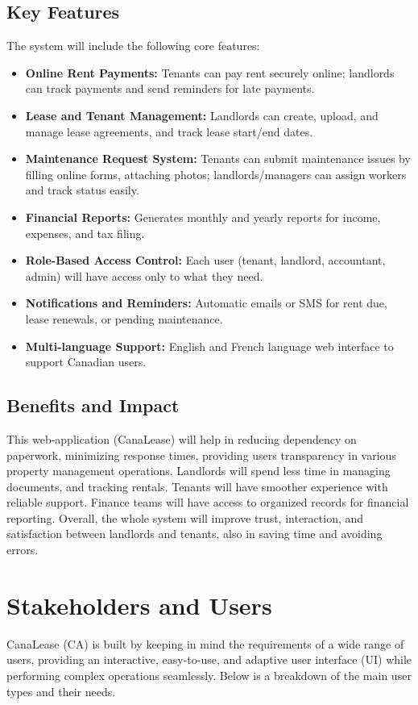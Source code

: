 \documentclass[12pt]{article}
\begin{document}
\subsection{Key Features}
The system will include the following core features:

\begin{itemize}
    \item \textbf{Online Rent Payments:} Tenants can pay rent securely online; landlords can track payments and send reminders for late payments.
    \item \textbf{Lease and Tenant Management:} Landlords can create, upload, and manage lease agreements, and track lease start/end dates.
    \item \textbf{Maintenance Request System:} Tenants can submit maintenance issues by filling online forms, attaching photos; landlords/managers can assign workers and track status easily.
    \item \textbf{Financial Reports:} Generates monthly and yearly reports for income, expenses, and tax filing.
    \item \textbf{Role-Based Access Control:} Each user (tenant, landlord, accountant, admin) will have access only to what they need.
    \item \textbf{Notifications and Reminders:} Automatic emails or SMS for rent due, lease renewals, or pending maintenance.
    \item \textbf{Multi-language Support:} English and French language web interface to support Canadian users.
\end{itemize}

\subsection{Benefits and Impact}
This web-application (CanaLease) will help in reducing dependency on paperwork, minimizing response times, providing users transparency in various property management operations. Landlords will spend less time in managing documents, and tracking rentals. Tenants will have smoother experience with reliable support. Finance teams will have access to organized records for financial reporting. Overall, the whole system will improve trust, interaction, and satisfaction between landlords and tenants, also in saving time and avoiding errors.  

\section{Stakeholders and Users}
CanaLease (CA) is built by keeping in mind the requirements of a wide range of users, providing an interactive, easy-to-use, and adaptive user interface (UI) while performing complex operations seamlessly. Below is a breakdown of the main user types and their needs.
\end{document}
